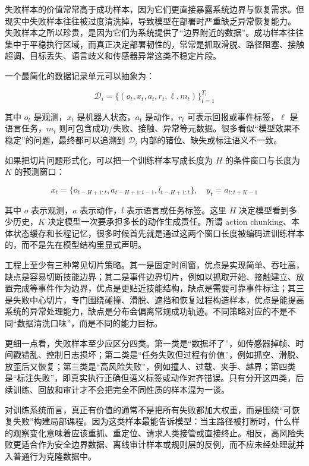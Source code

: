 失败样本的价值常常高于成功样本，因为它们更直接暴露系统边界与恢复需求。但现实中失败样本往往被过度清洗掉，导致模型在部署时严重缺乏异常恢复能力。 失败样本之所以珍贵，是因为它们为系统提供了“边界附近的数据”。成功样本往往集中于平稳执行区域，而真正决定部署韧性的，常常是抓取滑脱、路径阻塞、接触超调、目标丢失、语言歧义和传感器异常这类不稳定片段。

一个最简化的数据记录单元可以抽象为：

\begingroup
\footnotesize
\begin{equation*}
\mathcal{D}_i = \{(o_t, x_t, a_t, r_t, \ell, m_t)\}_{t=1}^{T_i}
\end{equation*}
\endgroup

其中 \(o_t\) 是观测，\(x_t\) 是机器人状态，\(a_t\) 是动作，\(r_t\) 可表示回报或事件标签，\(\ell\) 是语言任务，\(m_t\) 则可包含成功/失败、接触、异常等元数据。很多看似“模型效果不稳定”的问题，最终都可以追溯到 \(\mathcal{D}_i\) 内部的错位、缺失或标注语义不一致。

如果把切片问题形式化，可以把一个训练样本写成长度为 \(H\) 的条件窗口与长度为 \(K\) 的预测窗口：

\begingroup
\footnotesize
\begin{equation*}
x_t = \{o_{t-H+1:t}, a_{t-H+1:t-1}, l_{t-H+1:t}\}, \quad
y_t = a_{t:t+K-1}
\end{equation*}
\endgroup

其中 \(o\) 表示观测，\(a\) 表示动作，\(l\) 表示语言或任务标签。这里 \(H\) 决定模型看到多少历史，\(K\) 决定模型一次要承担多长的动作生成责任。所谓 action chunking、本体状态缓存和长程记忆，很多时候首先就是通过这两个窗口长度被编码进训练样本的，而不是先在模型结构里显式声明。

工程上至少有三种常见切片策略。其一是固定时间窗，优点是实现简单、吞吐高，缺点是容易切断技能边界；其二是事件边界切片，例如以抓取开始、接触建立、放置完成等事件作为边界，优点是更贴近技能结构，缺点是需要可靠事件标注；其三是失败中心切片，专门围绕碰撞、滑脱、遮挡和恢复过程构造样本，优点是能提高系统的异常处理能力，缺点是分布会偏离常规成功轨迹。不同策略对应的不是不同“数据清洗口味”，而是不同的能力目标。

更细一点看，失败样本至少应区分四类。第一类是“数据坏了”，如传感器掉帧、时间戳错乱、控制日志损坏；第二类是“任务失败但过程有价值”，例如抓空、滑脱、放歪后又恢复；第三类是“高风险失败”，例如撞人、过载、夹手、越界；第四类是“标注失败”，即真实执行正确但语义标签或动作对齐错误。只有分开这四类，后续训练、回放和审计才不会把完全不同性质的样本混为一谈。

对训练系统而言，真正有价值的通常不是把所有失败都加大权重，而是围绕“可恢复失败”构建局部课程。因为这类样本最能告诉模型：当主路径被打断时，什么样的观察变化意味着应该重抓、重定位、请求人类接管或直接终止。相反，高风险失败更适合作为安全边界数据、离线审计样本或规则层的反例，而不应未经处理就并入普通行为克隆数据中。

